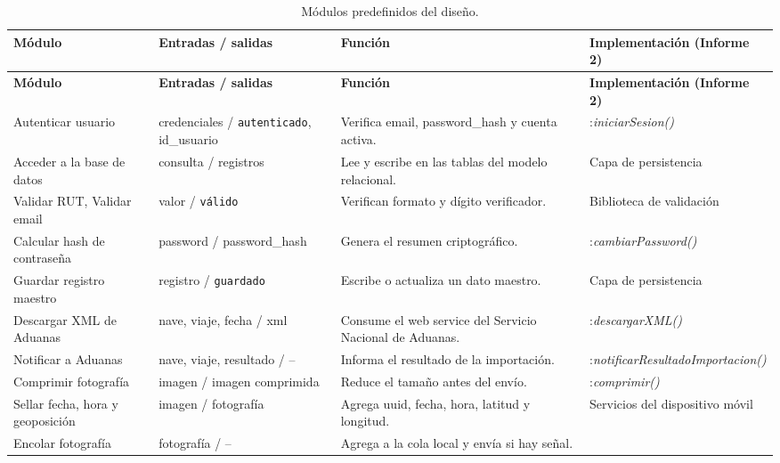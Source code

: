 {\estilotabla
\begin{longtable}{|L{3.0cm}|L{3.2cm}|L{3.8cm}|L{4.6cm}|}
\caption{Módulos predefinidos del diseño.}
\label{tab:mod-predefinidos}\\
\hline
{}
\textbf{Módulo} & \textbf{Entradas / salidas} & \textbf{Función} & \textbf{Implementación
(Informe 2)} \\ \hline
\endfirsthead
\hline
{}
\textbf{Módulo} & \textbf{Entradas / salidas} & \textbf{Función} & \textbf{Implementación
(Informe 2)} \\ \hline
\endhead
Autenticar usuario & credenciales / \texttt{autenticado}, id\_usuario & Verifica email,
password\_hash y cuenta activa. & :\newline \textit{iniciarSesion()} \\ \hline
Acceder a la base de datos & consulta / registros & Lee y escribe en las tablas del modelo
relacional. & Capa de persistencia \\ \hline
Validar RUT, Validar email & valor / \texttt{válido} & Verifican formato y dígito
verificador. & Biblioteca de validación \\ \hline
Calcular hash de contraseña & password / password\_hash & Genera el resumen criptográfico.
& :\newline \textit{cambiarPassword()} \\ \hline
Guardar registro maestro & registro / \texttt{guardado} & Escribe o actualiza un dato
maestro. & Capa de persistencia \\ \hline
Descargar XML de Aduanas & nave, viaje, fecha / xml & Consume el web service del Servicio
Nacional de Aduanas. & :\newline \textit{descargarXML()} \\ \hline
Notificar a Aduanas & nave, viaje, resultado / -- & Informa el resultado de la
importación. & :\newline \textit{notificarResultadoImportacion()} \\ \hline
Comprimir fotografía & imagen / imagen comprimida & Reduce el tamaño antes del envío. &
:\newline \textit{comprimir()} \\ \hline
Sellar fecha, hora y geoposición & imagen / fotografía & Agrega uuid, fecha, hora,
latitud y longitud. & Servicios del dispositivo móvil \\ \hline
Encolar fotografía & fotografía / -- & Agrega a la cola local y envía si hay señal. &

\end{longtable}}
